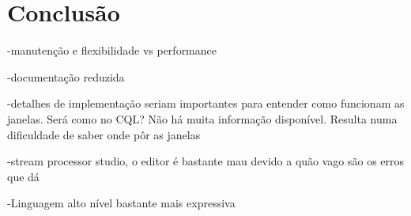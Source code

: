 \documentclass[article]{IEEEtran}
\begin{document}
\section{Conclusão} 
-manutenção e flexibilidade vs performance

-documentação reduzida

-detalhes de implementação seriam importantes para entender como funcionam as janelas. Será como no CQL? Não há muita informação disponível. Resulta numa dificuldade de saber onde pôr as janelas

-stream processor studio, o editor é bastante mau devido a quão vago são os erros que dá

-Linguagem alto nível bastante mais expressiva







\end{document}
